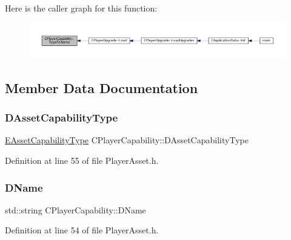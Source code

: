 Here is the caller graph for this function\+:\nopagebreak
\begin{figure}[H]
\begin{center}
\leavevmode
\includegraphics[width=350pt]{classCPlayerCapability_a976f05b7e620b721bdb5051debc9b93d_icgraph}
\end{center}
\end{figure}


\subsection{Member Data Documentation}
\hypertarget{classCPlayerCapability_a09011bc8c74c698bfb65f06a1840c6e1}{}\label{classCPlayerCapability_a09011bc8c74c698bfb65f06a1840c6e1} 
\subsubsection{\texorpdfstring{D\+Asset\+Capability\+Type}{DAssetCapabilityType}}
{\footnotesize\ttfamily \hyperlink{GameDataTypes_8h_a35b98ce26aca678b03c6f9f76e4778ce}{E\+Asset\+Capability\+Type} C\+Player\+Capability\+::\+D\+Asset\+Capability\+Type\hspace{0.3cm}{\ttfamily [protected]}}



Definition at line 55 of file Player\+Asset.\+h.

\hypertarget{classCPlayerCapability_aae795f4ae4c19a9c7792a4101ca18560}{}\label{classCPlayerCapability_aae795f4ae4c19a9c7792a4101ca18560} 
\subsubsection{\texorpdfstring{D\+Name}{DName}}
{\footnotesize\ttfamily std\+::string C\+Player\+Capability\+::\+D\+Name\hspace{0.3cm}{\ttfamily [protected]}}



Definition at line 54 of file Player\+Asset.\+h.

